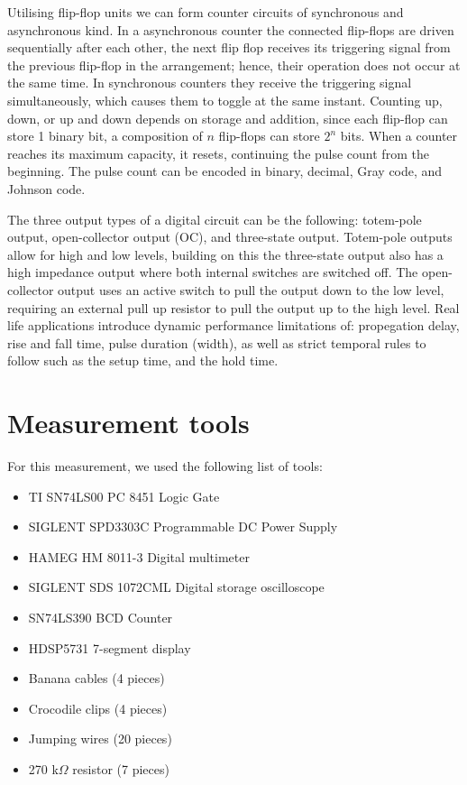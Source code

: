 \documentclass[12pt]{article}
\begin{document}
Utilising flip-flop units we can form counter circuits of synchronous and asynchronous kind. In a asynchronous 
counter the connected flip-flops are driven sequentially after each other, the next flip flop receives its triggering 
signal from the previous flip-flop in the arrangement; hence, their operation does not occur at the same time. 
In synchronous counters they receive the triggering signal simultaneously, which causes them to toggle at the same 
instant. Counting up, down, or up and down depends on storage and addition, since each flip-flop can store 1 binary bit, a composition of 
$n$ flip-flops can store $2^n$ bits. When a counter reaches its maximum capacity, it resets, continuing the pulse 
count from the beginning. The pulse count can be encoded in binary, decimal, Gray code, and Johnson code.

The three output types of a digital circuit can be the following: totem-pole output, open-collector output (OC), 
and three-state output. Totem-pole outputs allow for high and low levels, building on this the three-state output 
also has a high impedance output where both internal switches are switched off. The open-collector output uses 
an active switch to pull the output down to the low level, requiring an external pull up resistor to pull the 
output up to the high level. Real life applications introduce dynamic performance limitations of: propegation delay, 
rise and fall time, pulse duration (width), as well as strict temporal rules to follow such as the setup time, and 
the hold time. 

\section{Measurement tools}
For this measurement, we used the following list of tools:
\begin{itemize}
\item TI SN74LS00 PC 8451 Logic Gate
\item SIGLENT SPD3303C Programmable DC Power Supply
\item HAMEG HM 8011-3 Digital multimeter
\item SIGLENT SDS 1072CML Digital storage oscilloscope
\item SN74LS390 BCD Counter
\item HDSP5731 7-segment display
\item Banana cables (4 pieces)
\item Crocodile clips (4 pieces)
\item Jumping wires (20 pieces)
\item 270 k$\Omega$ resistor (7 pieces)
\end{itemize}
\end{document}

